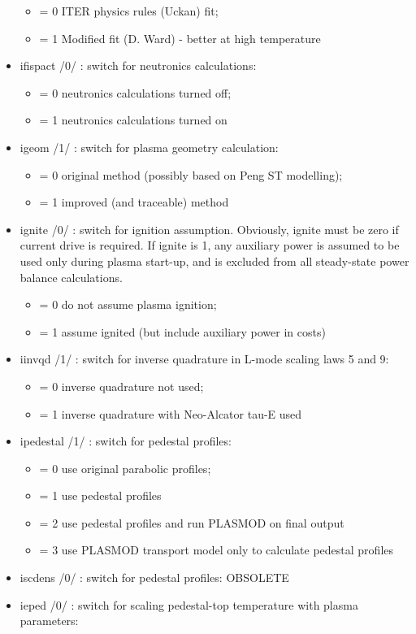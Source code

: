 \documentclass[]{article}
\providecommand{\tightlist}{%
  \setlength{\itemsep}{0pt}\setlength{\parskip}{0pt}}
\begin{document}
\begin{itemize}
  \begin{itemize}
  \tightlist
  \item
    = 0 ITER physics rules (Uckan) fit;
  \item
    = 1 Modified fit (D. Ward) - better at high temperature
  \end{itemize}
\item
  ifispact /0/ : switch for neutronics calculations:

  \begin{itemize}
  \tightlist
  \item
    = 0 neutronics calculations turned off;
  \item
    = 1 neutronics calculations turned on
  \end{itemize}
\item
  igeom /1/ : switch for plasma geometry calculation:

  \begin{itemize}
  \tightlist
  \item
    = 0 original method (possibly based on Peng ST modelling);
  \item
    = 1 improved (and traceable) method
  \end{itemize}
\item
  ignite /0/ : switch for ignition assumption. Obviously, ignite must be
  zero if current drive is required. If ignite is 1, any auxiliary power
  is assumed to be used only during plasma start-up, and is excluded
  from all steady-state power balance calculations.

  \begin{itemize}
  \tightlist
  \item
    = 0 do not assume plasma ignition;
  \item
    = 1 assume ignited (but include auxiliary power in costs)
  \end{itemize}
\item
  iinvqd /1/ : switch for inverse quadrature in L-mode scaling laws 5
  and 9:

  \begin{itemize}
  \tightlist
  \item
    = 0 inverse quadrature not used;
  \item
    = 1 inverse quadrature with Neo-Alcator tau-E used
  \end{itemize}
\item
  ipedestal /1/ : switch for pedestal profiles:

  \begin{itemize}
  \tightlist
  \item
    = 0 use original parabolic profiles;
  \item
    = 1 use pedestal profiles
  \item
    = 2 use pedestal profiles and run PLASMOD on final output
  \item
    = 3 use PLASMOD transport model only to calculate pedestal profiles
  \end{itemize}
\item
  iscdens /0/ : switch for pedestal profiles: OBSOLETE
\item
  ieped /0/ : switch for scaling pedestal-top temperature with plasma
  parameters:


\end{itemize}
\end{document}
